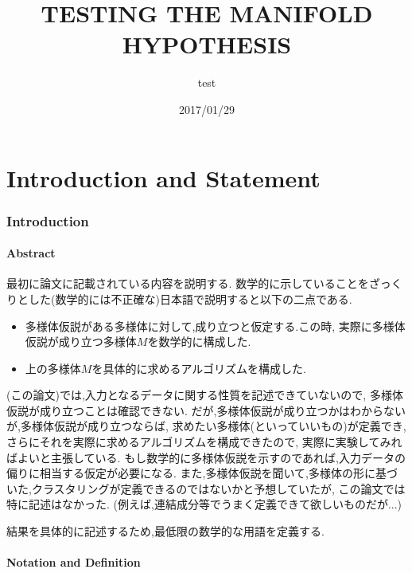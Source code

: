 \documentclass{jarticle}
\title{TESTING THE MANIFOLD HYPOTHESIS}
\author{test}
\date{2017/01/29}
\begin{document}
\part{Introduction and Statement}
\label{part:1}



\section{Introduction}
\label{introduction}


\subsection{Abstract}
\label{sub:Abstract}

最初に論文に記載されている内容を説明する.
数学的に示していることをざっくりとした(数学的には不正確な)日本語で説明すると以下の二点である.
\begin{itemize}
  \item 多様体仮説がある多様体に対して,成り立つと仮定する.この時,
  実際に多様体仮説が成り立つ多様体$M$を数学的に構成した.
  \item 上の多様体$M$を具体的に求めるアルゴリズムを構成した.
\end{itemize}

(この論文)では,入力となるデータに関する性質を記述できていないので,
多様体仮説が成り立つことは確認できない.
だが,多様体仮説が成り立つかはわからないが,多様体仮説が成り立つならば,
求めたい多様体(といっていいもの)が定義でき,さらにそれを実際に求めるアルゴリズムを構成できたので,
実際に実験してみればよいと主張している.
もし数学的に多様体仮説を示すのであれば,入力データの偏りに相当する仮定が必要になる.
また,多様体仮説を聞いて,多様体の形に基づいた,クラスタリングが定義できるのではないかと予想していたが,
この論文では特に記述はなかった.
(例えば,連結成分等でうまく定義できて欲しいものだが...)

結果を具体的に記述するため,最低限の数学的な用語を定義する.
\subsection{Notation and Definition}
\label{sub:Notation and Definition}
\end{document}
